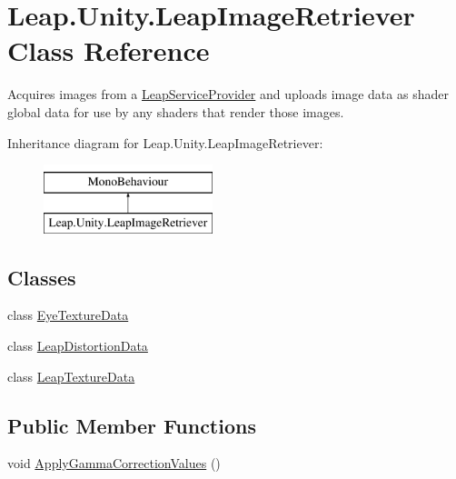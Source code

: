 \hypertarget{class_leap_1_1_unity_1_1_leap_image_retriever}{}\section{Leap.\+Unity.\+Leap\+Image\+Retriever Class Reference}
\label{class_leap_1_1_unity_1_1_leap_image_retriever}


Acquires images from a \mbox{\hyperlink{class_leap_1_1_unity_1_1_leap_service_provider}{Leap\+Service\+Provider}} and uploads image data as shader global data for use by any shaders that render those images.  


Inheritance diagram for Leap.\+Unity.\+Leap\+Image\+Retriever\+:\begin{figure}[H]
\begin{center}
\leavevmode
\includegraphics[height=2.000000cm]{class_leap_1_1_unity_1_1_leap_image_retriever}
\end{center}
\end{figure}
\subsection*{Classes}
\begin{DoxyCompactItemize}
\item 
class \mbox{\hyperlink{class_leap_1_1_unity_1_1_leap_image_retriever_1_1_eye_texture_data}{Eye\+Texture\+Data}}
\item 
class \mbox{\hyperlink{class_leap_1_1_unity_1_1_leap_image_retriever_1_1_leap_distortion_data}{Leap\+Distortion\+Data}}
\item 
class \mbox{\hyperlink{class_leap_1_1_unity_1_1_leap_image_retriever_1_1_leap_texture_data}{Leap\+Texture\+Data}}
\end{DoxyCompactItemize}
\subsection*{Public Member Functions}
\begin{DoxyCompactItemize}
\item 
void \mbox{\hyperlink{class_leap_1_1_unity_1_1_leap_image_retriever_a51a8db3bc82cbcb3f7b38831fa01763f}{Apply\+Gamma\+Correction\+Values}} ()
\end{DoxyCompactItemize}
